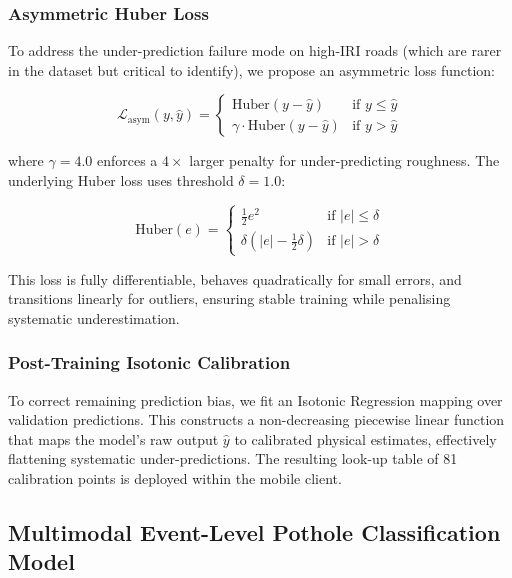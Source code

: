 \documentclass[conference]{IEEEtran}
\begin{document}
\subsubsection{Asymmetric Huber Loss}

To address the under-prediction failure mode on high-IRI roads (which are rarer in the dataset but critical to identify), we propose an asymmetric loss function:

\begin{equation}
\label{eq:asym_huber}
\mathcal{L}_{\text{asym}}(y, \hat{y}) = \begin{cases} \text{Huber}(y - \hat{y}) & \text{if } y \le \hat{y} \\ \gamma \cdot \text{Huber}(y - \hat{y}) & \text{if } y > \hat{y} \end{cases}
\end{equation}

where $\gamma = 4.0$ enforces a $4\times$ larger penalty for under-predicting roughness.
The underlying Huber loss uses threshold $\delta = 1.0$:

\begin{equation}
\label{eq:huber}
\text{Huber}(e) = \begin{cases} \frac{1}{2} e^2 & \text{if } |e| \le \delta \\ \delta \left(|e| - \frac{1}{2}\delta\right) & \text{if } |e| > \delta \end{cases}
\end{equation}

This loss is fully differentiable, behaves quadratically for small errors, and transitions linearly for outliers, ensuring stable training while penalising systematic underestimation.

\subsubsection{Post-Training Isotonic Calibration}

To correct remaining prediction bias, we fit an Isotonic Regression mapping over validation predictions.
This constructs a non-decreasing piecewise linear function that maps the model's raw output $\hat{y}$ to calibrated physical estimates, effectively flattening systematic under-predictions.
The resulting look-up table of 81 calibration points is deployed within the mobile client.

\subsection{Multimodal Event-Level Pothole Classification Model}
\label{sec:pothole_model}
\end{document}
